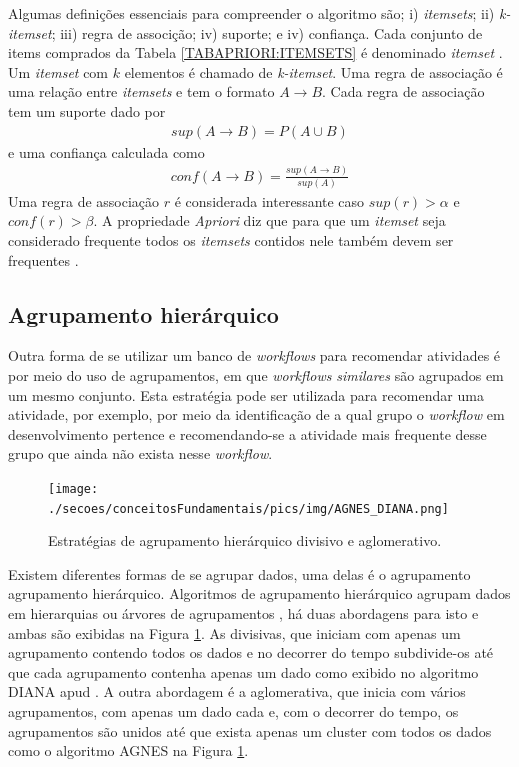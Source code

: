Algumas definições essenciais para compreender o algoritmo são; i) \emph{itemsets}; ii) \emph{k-itemset}; iii) regra de associção; iv) suporte; e iv) confiança. Cada conjunto de items comprados da Tabela \ref{TABAPRIORI:ITEMSETS} é denominado \emph{itemset} \cite{HanKamber2011}. Um \emph{itemset} com \(k\) elementos é chamado de \emph{k-itemset}. Uma regra de associação é uma relação entre \emph{itemsets} e tem o formato \(A \rightarrow B\). Cada regra de associação tem um suporte dado por
\begin{align}
sup(A \rightarrow B) =  P(A \cup B)
\end{align}
e uma confiança calculada como
\begin{align}
conf(A \rightarrow B) =  \frac{sup(A \rightarrow B)}{sup(A)}
\end{align}
Uma regra de associação \(r\) é considerada interessante caso \(sup(r) > \alpha\) e \(conf(r) > \beta\). A propriedade \emph{Apriori} diz que para que um \emph{itemset} seja considerado frequente todos os \emph{itemsets} contidos nele também devem ser frequentes \cite{HanKamber2011}. 

\subsection{Agrupamento hierárquico}\label{HHIERARQUICO}
Outra forma de se utilizar um banco de \emph{workflows} para recomendar atividades é por meio do uso de agrupamentos, em que \emph{workflows} \emph{similares} são agrupados em um mesmo conjunto. Esta estratégia pode ser utilizada para recomendar uma atividade, por exemplo, por meio da identificação de a qual grupo o \emph{workflow} em desenvolvimento pertence e recomendando-se a atividade mais frequente desse grupo que ainda não exista nesse \emph{workflow}.
\begin{figure}[!htb]
    \centering  
    \caption{Estratégias de agrupamento hierárquico divisivo e aglomerativo.}
    \texttt{[image: ./secoes/conceitosFundamentais/pics/img/AGNES\_DIANA.png]}
	\label{figura_exemplo_clusters}
\end{figure}

Existem diferentes formas de se agrupar dados, uma delas é o agrupamento agrupamento hierárquico. Algoritmos de agrupamento hierárquico agrupam dados em hierarquias ou árvores de agrupamentos \cite{HanKamber2011}, há duas abordagens para isto e ambas são exibidas na Figura \ref{figura_exemplo_clusters}. As divisivas, que iniciam com apenas um agrupamento contendo todos os dados e no decorrer do tempo subdivide-os até que cada agrupamento contenha apenas um dado como exibido no algoritmo DIANA  apud . A outra abordagem é a aglomerativa, que inicia com vários agrupamentos, com apenas um dado cada e, com o decorrer do tempo, os agrupamentos são unidos até que exista apenas um cluster com todos os dados como o algoritmo AGNES na Figura \ref{figura_exemplo_clusters}.

